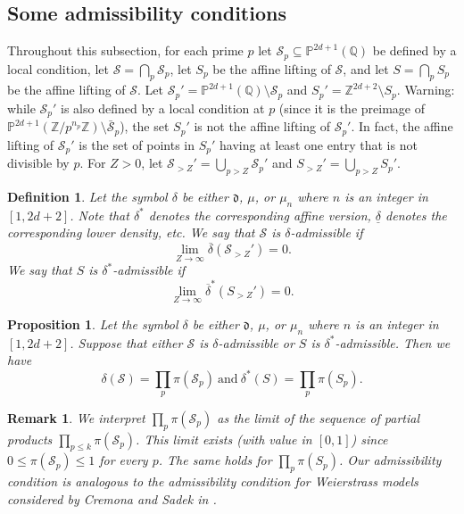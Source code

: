 \documentclass[12pt]{amsart}
\newtheorem{definition}[theorem]{Definition}
\newtheorem{remark}[theorem]{Remark}
\newtheorem{proposition}[theorem]{Proposition}
\newcommand{\Z}{\mathbb{Z}}
\newcommand{\Q}{\mathbb{Q}}
\numberwithin{equation}{section}
\begin{document}
\subsection{Some admissibility conditions}\label{subsec:admissibility}
Throughout this subsection, for each prime $p$ let $\mathcal{S}_p\subseteq \mathbb{P}^{2d+1}(\Q)$ be 
defined by a local condition, let $\mathcal{S}=\bigcap_p \mathcal{S}_p$, let $S_p$
be the affine lifting of $\mathcal{S}$, and let $S=\bigcap_p S_p$ be the affine lifting of $\mathcal{S}$. Let $\mathcal{S}_p'=\mathbb{P}^{2d+1}(\Q)\setminus \mathcal{S}_p$ and  $S_p'=\Z^{2d+2}\setminus S_p$. 
Warning: while $\mathcal{S}_p'$ is also defined by a local condition
at $p$ (since it is the preimage of $\mathbb{P}^{2d+1}(\Z/p^{n_p}\Z)\setminus\bar{\mathcal{S}}_p$), the 
set $S_p'$ is not the affine lifting of $\mathcal{S}_p'$. 
In fact, the affine lifting of $\mathcal{S}_p'$ is the set of points in $S_p'$ having at least one entry that is not divisible by $p$.
For $Z>0$, let
$\mathcal{S}_{>Z}'=\bigcup_{p>Z} \mathcal{S}_p'$ and 
$S_{>Z}'=\bigcup_{p>Z}S_p'$.

\begin{definition}\label{def:admissibility conditions}
    Let the symbol $\delta$ be either $\mathfrak{d}$, $\mu$, or $\mu_n$ where $n$ is an integer in $[1,2d+2]$. Note that $\delta^*$ denotes the corresponding affine version, $\underline{\delta}$ denotes the corresponding lower density, etc.
    We say that $\mathcal{S}$ is $\delta$-admissible if
    $$\lim_{Z\to\infty} \overline{\delta}(\mathcal{S}_{>Z}')=0.$$
    We say that $S$ is $\delta^*$-admissible if
    $$\lim_{Z\to\infty}\overline{\delta}^*(S_{>Z}')=0.$$
\end{definition}

\begin{proposition}\label{prop:symbol delta admissible}
    Let the symbol $\delta$ be either $\mathfrak{d}$, $\mu$, or $\mu_n$ where $n$ is an integer in $[1,2d+2]$. Suppose that either $\mathcal{S}$ is $\delta$-admissible or $S$ is $\delta^*$-admissible. Then we have
    \begin{equation}
        \delta(\mathcal{S})=\prod_p \pi(\mathcal{S}_p)\ \text{and}\ \delta^*(S)=\prod_p \pi(S_p).
    \end{equation}
\end{proposition}


\begin{remark}
    We interpret $\prod_p \pi(\mathcal{S}_p)$ as the limit of the sequence of partial products $\prod_{p\leq k}\pi(\mathcal{S}_p)$. This limit exists (with value in $[0,1]$) since $0\leq \pi(\mathcal{S}_p)\leq 1$ for every $p$. The same holds for 
    $\prod_p \pi(S_p)$. Our admissibility condition is analogous to the admissibility condition for Weierstrass models considered by Cremona and Sadek in \cite[Definition 4]{cremonasadek}.
\end{remark}
\end{document}
